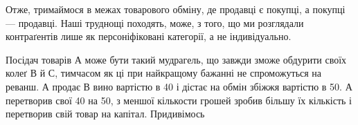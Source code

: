 Отже, тримаймося в межах товарового обміну, де продавці
є покупці, а покупці — продавці. Наші труднощі походять,
може, з того, що ми розглядали контраґентів лише як персоніфіковані
категорії, а не індивідуально.

Посідач товарів $А$ може бути такий мудрагель, що завжди
зможе обдурити своїх колеґ $В$ й $С$, тимчасом як ці при найкращому
бажанні не спроможуться на реванш. $А$ продає $В$ вино вартістю
в 40 і дістає на обмін збіжжя вартістю в
50. $А$ перетворив свої 40
на 50, з меншої кількости грошей зробив більшу
їх кількість і перетворив свій товар на капітал. Придивімось
\parbreak{}  %
